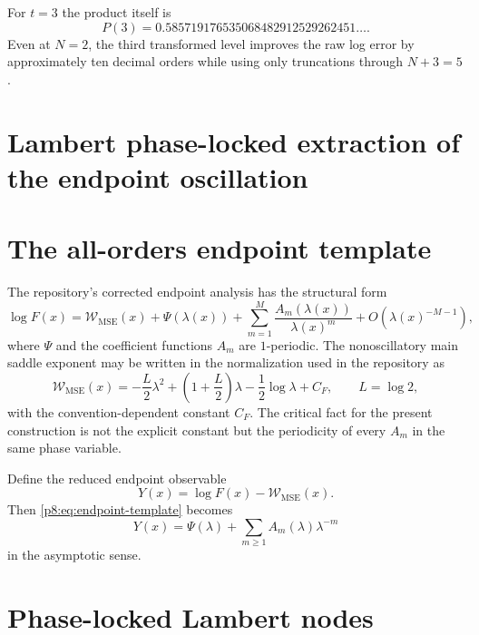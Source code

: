 \documentclass[11pt]{article}
\numberwithin{equation}{section}
\theoremstyle{definition}
\theoremstyle{remark}
\begin{document}
For $t=3$ the product itself is
\begin{equation}
P(3)=0.585719176535068482912529262451\ldots.
\label{p8:eq:P3}
\end{equation}
Even at $N=2$, the third transformed level improves the raw log error by approximately ten decimal orders while using only truncations through $N+3=5$.

\section{Lambert phase-locked extraction of the endpoint oscillation}

\section{The all-orders endpoint template}
\label{p8:sec:lambert-template}

The repository's corrected endpoint analysis has the structural form
\begin{equation}
\log F(x)=\mathcal W_{\mathrm{MSE}}(x)+\Psi(\lambda(x))
+\sum_{m=1}^{M}\frac{A_m(\lambda(x))}{\lambda(x)^m}
+O\!\left(\lambda(x)^{-M-1}\right),
\label{p8:eq:endpoint-template}
\end{equation}
where $\Psi$ and the coefficient functions $A_m$ are $1$-periodic. The nonoscillatory main saddle exponent may be written in the normalization used in the repository as
\begin{equation}
\mathcal W_{\mathrm{MSE}}(x)
=-\frac{L}{2}\lambda^2+
\left(1+\frac L2\right)\lambda
-\frac12\log\lambda+C_F,
\qquad L=\log2,
\label{p8:eq:Wmse}
\end{equation}
with the convention-dependent constant $C_F$. The critical fact for the present construction is not the explicit constant but the periodicity of every $A_m$ in the same phase variable.

Define the reduced endpoint observable
\begin{equation}
Y(x)=\log F(x)-\mathcal W_{\mathrm{MSE}}(x).
\label{p8:eq:Y}
\end{equation}
Then \cref{p8:eq:endpoint-template} becomes
\begin{equation}
Y(x)=\Psi(\lambda)+\sum_{m\ge1}A_m(\lambda)\lambda^{-m}
\label{p8:eq:Y-expansion}
\end{equation}
in the asymptotic sense.

\section{Phase-locked Lambert nodes}
\label{p8:sec:lambert}
\end{document}
